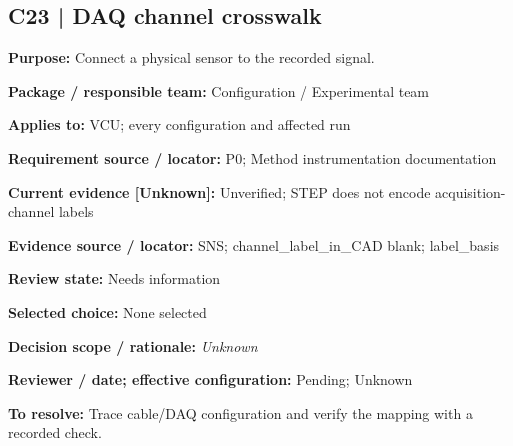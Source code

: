 \documentclass[11pt]{article}
\begin{document}
\par\noindent\begin{minipage}{\textwidth}\small\setlength{\parskip}{2pt}
\subsection*{C23 | DAQ channel crosswalk}
\textbf{Purpose:} Connect a physical sensor to the recorded signal.\par
\textbf{Package / responsible team:} Configuration / Experimental team\par
\textbf{Applies to:} VCU; every configuration and affected run\par
\textbf{Requirement source / locator:} P0; Method instrumentation documentation\par
\textbf{Current evidence [Unknown]:} Unverified; STEP does not encode acquisition-channel labels\par
\textbf{Evidence source / locator:} SNS; channel\_\allowbreak{}label\_\allowbreak{}in\_\allowbreak{}CAD blank; label\_\allowbreak{}basis\par
\textbf{Review state:} Needs information\par
\textbf{Selected choice:} None selected\par
\textbf{Decision scope / rationale:} \textit{Unknown}\par
\textbf{Reviewer / date; effective configuration:} Pending; Unknown\par
\textbf{To resolve:} Trace cable/DAQ configuration and verify the mapping with a recorded check.\par
\end{minipage}\par\vspace{5pt}
\end{document}
